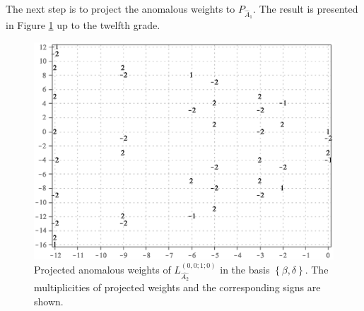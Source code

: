 \documentclass[12pt]{iopart}
\theoremstyle{definition}
\begin{document}
The next step is to project the anomalous weights to $P_{\hat A_1}$.
The result is presented in Figure \ref{fig:AffineA2_A1_anom_proj} up to the twelfth grade.
\begin{figure}[h!tb]
  \centering
  \includegraphics[width=130mm]{figure8.eps}
  \caption{Projected anomalous weights of $L^{(0,0;1;0)}_{\hat{A_2}}$ in the basis $\left\{\beta,\delta \right\}$.
  The multiplicities of projected weights and the corresponding signs are shown. }
  \label{fig:AffineA2_A1_anom_proj}
\end{figure}
\end{document}
